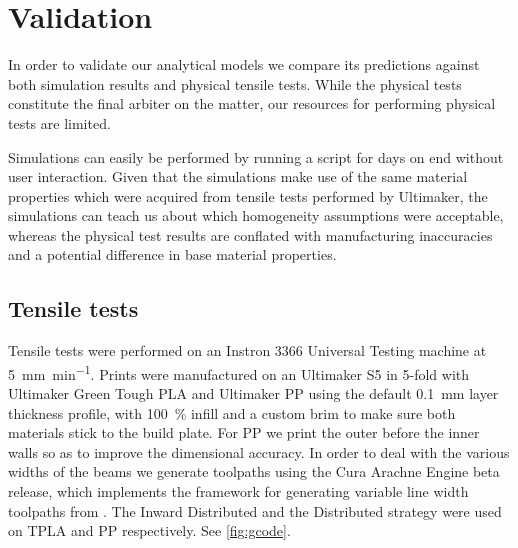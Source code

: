 \section{Validation}
In order to validate our analytical models we compare its predictions against both simulation results and physical tensile tests.
While the physical tests constitute the final arbiter on the matter,
our resources for performing physical tests are limited.

Simulations can easily be performed by running a script for days on end without user interaction.
Given that the simulations make use of the same material properties which were acquired from tensile tests performed by Ultimaker,
the simulations can teach us about which homogeneity assumptions were acceptable,
whereas the physical test results are conflated with manufacturing inaccuracies and a potential difference in base material properties.








\subsection{Tensile tests}
Tensile tests were performed on an Instron 3366 Universal Testing machine at \SI{5}{\milli\meter\per\minute}.
Prints were manufactured on an Ultimaker S5 in 5-fold with Ultimaker Green Tough PLA and Ultimaker PP using the default \SI{0.1}{\milli\meter} layer thickness profile,
with \SI{100}{\percent} infill and a custom brim to make sure both materials stick to the build plate.
For PP we print the outer before the inner walls so as to improve the dimensional accuracy. %
In order to deal with the various widths of the beams we generate toolpaths using the Cura Arachne Engine beta release\cite{CuraArachne},
which implements the framework for generating variable line width toolpaths from \cite{Kuipers2020}.
The Inward Distributed and the Distributed strategy were used on TPLA and PP respectively.
See \cref{fig:gcode}.



